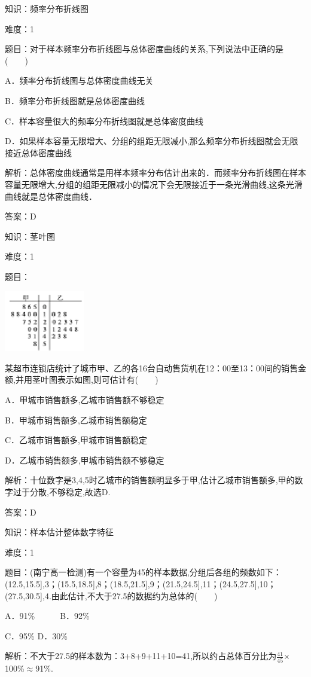 \documentclass{article} %
\begin{document}
知识：频率分布折线图

难度：1

题目：对于样本频率分布折线图与总体密度曲线的关系,下列说法中正确的是(　　)

A．频率分布折线图与总体密度曲线无关

B．频率分布折线图就是总体密度曲线

C．样本容量很大的频率分布折线图就是总体密度曲线

D．如果样本容量无限增大、分组的组距无限减小,那么频率分布折线图就会无限接近总体密度曲线

解析：总体密度曲线通常是用样本频率分布估计出来的．而频率分布折线图在样本容量无限增大,分组的组距无限减小的情况下会无限接近于一条光滑曲线,这条光滑曲线就是总体密度曲线．

答案：D


知识：茎叶图

难度：1

题目：

\includegraphics*[width=1.38in, height=1.05in, keepaspectratio=false]{image82}

某超市连锁店统计了城市甲、乙的各16台自动售货机在12：00至13：00间的销售金额,并用茎叶图表示如图,则可估计有(　　)

A．甲城市销售额多,乙城市销售额不够稳定

B．甲城市销售额多,乙城市销售额稳定

C．乙城市销售额多,甲城市销售额稳定

D．乙城市销售额多,甲城市销售额不够稳定

解析：十位数字是3,4,5时乙城市的销售额明显多于甲,估计乙城市销售额多,甲的数字过于分散,不够稳定,故选D.

答案：D

知识：样本估计整体数字特征

难度：1

题目：(南宁高一检测)有一个容量为45的样本数据,分组后各组的频数如下：(12.5,15.5],3；(15.5,18.5],8；(18.5,21.5],9；(21.5,24.5],11；(24.5,27.5],10；(27.5,30.5],4.由此估计,不大于27.5的数据约为总体的(　　)

A．91\%　　　B．92\%

C．95\%     D．30\%

解析：不大于27.5的样本数为：3+8+9+11+10=41,所以约占总体百分比为$\frac{41}{45}\mathrm{\times}$100\%$\mathrm{\approx}$91\%.
\end{document}
